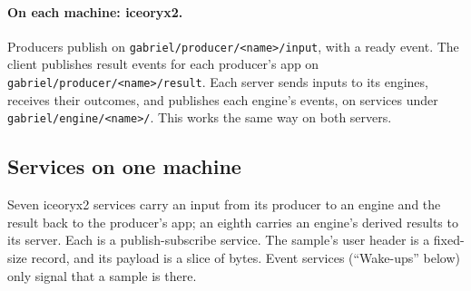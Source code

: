 \documentclass[11pt]{article}
\begin{document}
\paragraph{On each machine: iceoryx2.} Producers publish on
\nolinkurl{gabriel/producer/<name>/input}, with a ready event. The client
publishes result events for each producer's app on
\nolinkurl{gabriel/producer/<name>/result}. Each server sends inputs to its
engines, receives their outcomes, and publishes each engine's events, on
services under \nolinkurl{gabriel/engine/<name>/}. This works the same way
on both servers.

\subsection{Services on one machine}
\label{sec:services}

Seven iceoryx2 services carry an input from its producer to an engine and the
result back to the producer's app; an eighth carries an engine's derived
results to its server. Each is a publish-subscribe service. The sample's user header is
a fixed-size record, and its payload is a slice of bytes. Event services
(``Wake-ups'' below) only signal that a sample is there.
\end{document}
